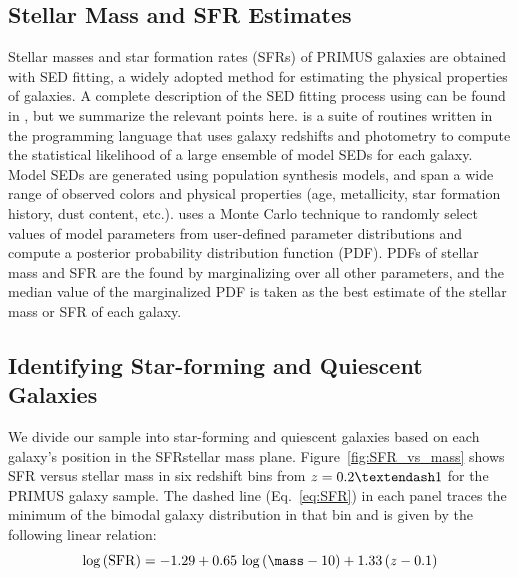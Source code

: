 \subsection{Stellar Mass and SFR Estimates}\label{sec:SFR}
 
Stellar masses and star formation rates (SFRs) of PRIMUS galaxies are obtained with SED fitting, a widely adopted method for estimating the physical properties of galaxies.
A complete description of the SED fitting process using \iSEDfit can be found in \citet{Moustakas13}, but we summarize the relevant points here.
\iSEDfit is a suite of routines written in the \IDL programming language that uses galaxy redshifts and photometry to compute the statistical likelihood of a large ensemble of model SEDs for each galaxy.
Model SEDs are generated using population synthesis models, and span a wide range of observed colors and physical properties (age, metallicity, star formation history, dust content, etc.).
\iSEDfit uses a Monte Carlo technique to randomly select values of model parameters from user-defined parameter distributions and compute a posterior probability distribution function (PDF).
PDFs of stellar mass and SFR are the found by marginalizing over all other parameters, and the median value of the marginalized PDF is taken as the best estimate of the stellar mass or SFR of each galaxy.

\subsection{Identifying Star-forming and Quiescent Galaxies}\label{sec:SFQ}

We divide our sample into star-forming and quiescent galaxies based on each galaxy's position in the SFR\textendash stellar mass plane. 
Figure~\ref{fig:SFR_vs_mass} shows SFR versus stellar mass in six redshift bins from ${z=0.2\textendash1}$ for the PRIMUS galaxy sample.
The dashed line (Eq.~\ref{eq:SFR}) in each panel traces the minimum of the bimodal galaxy distribution in that bin and is given by the following linear relation:
\begin{equation}\label{eq:SFR}
\log\,({\rm SFR}) = -1.29 + 0.65\,\log\,(\mass - 10) + 1.33\,(z - 0.1)
\end{equation}


